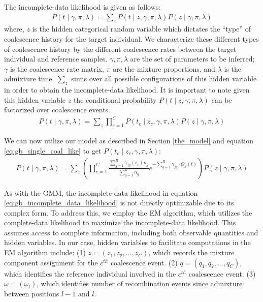 The incomplete-data likelihood is given as follows: 
\begin{align}
    P(t \mid \gamma, \pi, \lambda) = \sum_{z} P(t \mid z, \gamma, \pi, \lambda) P(z \mid \gamma, \pi, \lambda) 
\end{align}
where, $z$ is the hidden categorical random variable which dictates the ``type'' of coalescence history for the target individual. We characterize these different types of coalescence history by the different coalescence rates between the target individual and reference samples. $\gamma, \pi, \lambda$ are the set of parameters to be inferred; $\gamma$ is the coalescence rate matrix, $\pi$ are the mixture proportions, and $\lambda$ is the admixture time. $\sum_{z}$ sums over all possible configurations of this hidden variable in order to obtain the incomplete-data likelihood. It is important to note given this hidden variable $z$ the conditional probability $P(t \mid z, \gamma, \pi, \lambda)$ can be factorized over coalescence events. 
\begin{align}
    P(t \mid \gamma, \pi, \lambda) = \sum_{z} \prod_{c=1}^C P(t_c \mid z_c, \gamma, \pi, \lambda) P(z \mid \gamma, \pi, \lambda) 
\end{align}

We can now utilize our model as described in Section \ref{the_model} and equation \ref{eq:gb_single_coal_like} to get $P(t_c \mid z_c,\gamma, \pi, \lambda)$:
\begin{align}
    P(t \mid \gamma, \pi, \lambda) = \sum_{z} \left( \prod_{c=1}^C \frac{\sum_{g=1}^R \gamma_{jg}(e_c) n_{g}}{\sum_{g=1}^R n_{g}} e^{-\sum_{g=1}^R \gamma_{jg} \cdot O_{g} (t)} \right) P(z \mid \gamma, \pi, \lambda) 
\label{eq:gb_incomplete_data_likelihood}
\end{align}

As with the GMM, the incomplete-data likelihood in equation \ref{eq:gb_incomplete_data_likelihood} is not directly optimizable due to its complex form. To address this, we employ the EM algorithm, which utilizes the complete-data likelihood to maximize the incomplete-data likelihood. This assumes access to complete information, including both observable quantities and hidden variables. In our case, hidden variables to facilitate computations in the EM algorithm include: (1) \( z = (z_1, z_2, \ldots, z_C) \), which records the mixture component assignment for the \( c^{th} \) coalescence event. (2) \( q = (q_1, q_2, \ldots, q_C) \), which identifies the reference individual involved in the \( c^{th} \) coalescence event. (3) $\omega = (\omega_l)$, which identifies number of recombination events since admixture between positions $l-1$ and $l$. 

